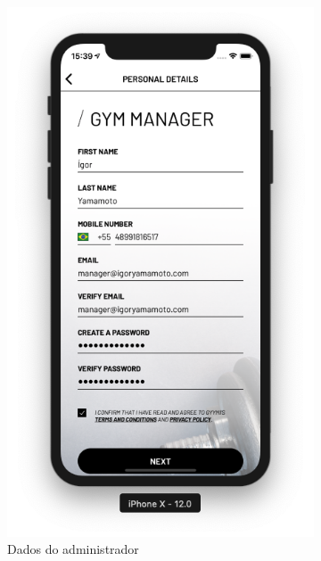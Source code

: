 \begin{figure}[H]
	\centering
    \begin{subfigure}[b]{0.4\textwidth}
        \includegraphics[width=\textwidth]{pfc/figuras/register-manager.png}
        \caption{Dados do administrador}
        \label{fig:register-manager-data}
    \end{subfigure}
    ~
	\begin{subfigure}[b]{0.4\textwidth}

\end{subfigure}
\end{figure}
